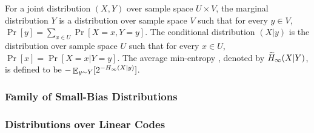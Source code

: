 For a joint distribution $(X,Y)$ over sample space $U \times V$, the marginal distribution $Y$ is a distribution over sample space $V$ such that for every $y \in V$, $\Pr[y] = \sum_{x \in U} \Pr[X = x, Y = y]$.
The conditional distribution $(X|y)$ is the distribution over sample space $U$ such that for every $x \in U$, $\Pr[x] = \Pr[X = x | Y = y]$.
The average min-entropy \cite{DORS08}, denoted by $\widetilde{H}_\infty(X|Y)$, is defined to be $-\mathop{{\mathbb E}}_{y \sim Y}[2^{-H_\infty(X|y)}]$.

\subsubsection{Family of Small-Bias Distributions}\label{sec:prelim-small-bias}

\subsubsection{Distributions over Linear Codes}\label{sec:prelim-codes}





